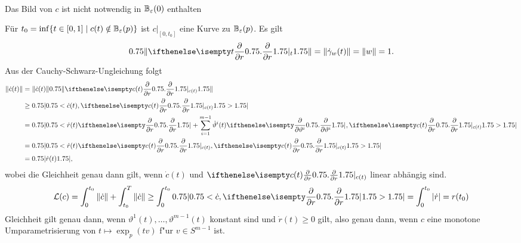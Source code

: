 \begin{bew}
\begin{center}
\\
Das Bild von $c$ ist nicht notwendig in $\operatorname{\mathbb{B}}_\varepsilon(0)$ enthalten
\end{center}
Für $t_0 = \inf\{t \in [0,1] \mid c(t) \notin \operatorname{\mathbb{B}}_{\varepsilon}(p)\}$ ist $c|_{[0,t_0]}$ eine Kurve zu $\operatorname{\mathbb{B}}_{\varepsilon}(p)$.
Es gilt
\begin{align*}
	\left\|\pdifffrac[t]{}{r}\right\| = \|\dot\gamma_w(t)\| = \|w\| = 1.
\end{align*}
Aus der Cauchy-Schwarz-Ungleichung folgt
\begin{align*}
	\|\dot c(t)\| & = \|\dot c(t)\|\left\|\pdifffrac[c(t)]{}{r}\right\|\\
	& \geq \left|\left< \dot c(t), \pdifffrac[c(t)]{}{r}\right>\right|\\
	& = \left|\left<\dot r(t) \pdifffrac{}{r} + \sum_{i=1}^{m-1}\dot\vartheta^i(t)\pdifffrac{}{\vartheta^i},\pdifffrac[c(t)]{}{r}\right>\right|\\
	& = \left|\left<\dot r(t)\pdifffrac[c(t)]{}{r}, \pdifffrac[c(t)]{}{r}\right>\right|\\
	& = \left|\dot r(t)\right|,
\end{align*}
wobei die Gleichheit genau dann gilt, wenn $\dot c(t)$ und $\pdifffrac[c(t)]{}{r}$ linear abhängig sind.
\begin{align*}
	\mathcal L(c) = \int_0^{t_0}\|\dot c\| + \int_{t_0}^T\|\dot c\| \geq \int_0^{t_0} \left|\left<\dot c,\pdifffrac{}{r}\right>\right| = \int_0^{t_0}|\dot r| = r(t_0)
\end{align*}
Gleichheit gilt genau dann, wenn $\vartheta^1(t), \ldots, \vartheta^{m-1}(t)$ konstant sind und $\dot r(t) \geq 0$ gilt, also genau dann, wenn $c$ eine monotone Umparametrisierung von $t \mapsto \exp_p(tv)$ f"ur $v \in S^{m-1}$ ist.
\end{bew}


